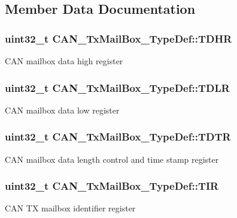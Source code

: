 \subsection{Member Data Documentation}
\hypertarget{struct_c_a_n___tx_mail_box___type_def_a98c6bcd7c9bae378ebf83fd9f5b59020}{
\subsubsection[{T\-D\-H\-R}]{ uint32\-\_\-t C\-A\-N\-\_\-\-Tx\-Mail\-Box\-\_\-\-Type\-Def\-::\-T\-D\-H\-R}}\label{struct_c_a_n___tx_mail_box___type_def_a98c6bcd7c9bae378ebf83fd9f5b59020}
C\-A\-N mailbox data high register \hypertarget{struct_c_a_n___tx_mail_box___type_def_a408c96501b1cc8bd527432736d132a39}{
\subsubsection[{T\-D\-L\-R}]{ uint32\-\_\-t C\-A\-N\-\_\-\-Tx\-Mail\-Box\-\_\-\-Type\-Def\-::\-T\-D\-L\-R}}\label{struct_c_a_n___tx_mail_box___type_def_a408c96501b1cc8bd527432736d132a39}
C\-A\-N mailbox data low register \hypertarget{struct_c_a_n___tx_mail_box___type_def_a2351cb865d064cf75f61642aaa887f76}{
\subsubsection[{T\-D\-T\-R}]{ uint32\-\_\-t C\-A\-N\-\_\-\-Tx\-Mail\-Box\-\_\-\-Type\-Def\-::\-T\-D\-T\-R}}\label{struct_c_a_n___tx_mail_box___type_def_a2351cb865d064cf75f61642aaa887f76}
C\-A\-N mailbox data length control and time stamp register \hypertarget{struct_c_a_n___tx_mail_box___type_def_a22f525c909de2dcec1d4093fe1d562b8}{
\subsubsection[{T\-I\-R}]{ uint32\-\_\-t C\-A\-N\-\_\-\-Tx\-Mail\-Box\-\_\-\-Type\-Def\-::\-T\-I\-R}}\label{struct_c_a_n___tx_mail_box___type_def_a22f525c909de2dcec1d4093fe1d562b8}
C\-A\-N T\-X mailbox identifier register 

